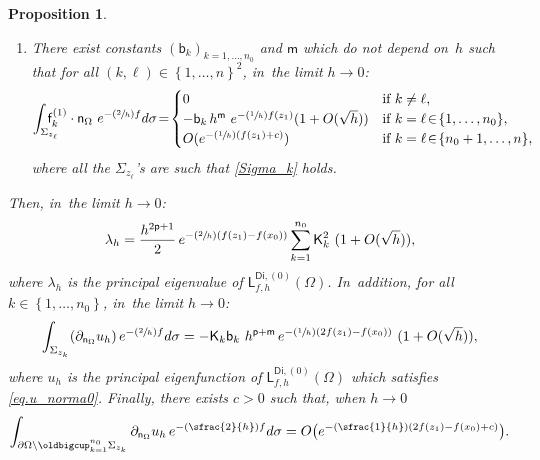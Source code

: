 \documentclass[JEP,XML,SOM,Unicode,NoEqCountersInSection,NoFloatCountersInSection,published]{cedram}
\newcommand{\Psfrac}[2]{(\sfrac{#1}{#2})}
\let\lp\langle
\let\rp\rangle
\let\ve\varepsilon
\theoremstyle{plain}
\newtheorem{proposition}{Proposition}
\theoremstyle{definition}
\begin{document}
\begin{proposition}
\begin{enumerate}
\begin{enumerate}
\begin{equation*}
\big \lp \nabla\mathsf u^{(0)}, \mathsf f_k^{(1)}\big\rp_{L^2_w(\Omega)} = \mathsf K_k\ h^{\mathsf p} e^{-\Psfrac{1}{h}(f(z_1)- f(x_0))} \ (1 + O(\sqrt h)),
\end{equation*}
where we recall $f(z_k)=f(z_1)$ for $k=1,\dots,n_0$. If~$k>n_0$, it~holds for $h$ small enough:
\begin{equation*}
\big \vert \big \lp \nabla\mathsf u^{(0)}, \mathsf f_k^{(1)}\big\rp_{L^2_w(\Omega)} \big \vert \le e^{-\Psfrac{1}{h}(f(z_1)- f(x_0) +\ve)}.
\end{equation*}
\item\label{ESTIME4b}
There exist constants $(\mathsf b_k)_{k=1,\dots,n_0}$ and $\mathsf m$ which do not depend on~$h$ such that for all $ (k,\ell)
\in \left\{1,\ldots,n\right\}^2$, in~the limit $h\to 0$:
\begin{equation*}
\int_{\Sigma_{z_\ell}} \!\!\! \!\!\! \mathsf
f_k^{(1)} \cdot \mathsf n_\Omega \ e^{-\Psfrac{2}{h} f} d\sigma
\!=\! \begin{cases} 0 & \text{if } k\neq \ell,\\
- \mathsf b_k \, h^{\mathsf m } \ e^{-\Psfrac{1}{h} f(z_1)} (1 + O(\sqrt h)) & \text{if } k=\ell \!\in\! \{1,\dots,n_0\}, \\
O(e^{-\Psfrac 1h (f(z_1) +c)}) & \text{if } k=\ell \!\in\! \{n_0+1,\ldots,n\},
\end{cases}
\end{equation*}
where all the $\Sigma_{z_\ell}$'s are such that \eqref{Sigma_k} holds.
\end{enumerate}
\end{enumerate}
Then, in~the limit $h\to 0$:
\[
\lambda_h=\frac{h^{2\mathsf p+1}}{2} \, e^{-\Psfrac{2}{h}(f(z_1)- f(x_0))} \sum_{k=1}^{n_0} \mathsf K_k^2 \ (1 + O(\sqrt h)),
\]
where $\lambda_h$ is the principal eigenvalue of $\mathsf L^{\mathsf{Di},(0)}_{f,h}(\Omega)$. In~addition, for all $k\in \left\{1,\ldots,n_0\right\}$, in~the limit $h\to 0$:
\begin{equation*}
\int_{\Sigma_{z_k}} (\partial_{\mathsf n_\Omega} u_h)\, e^{-\Psfrac{2}{h}f} d\sigma = -\mathsf K_k \mathsf b_k \ h^{\mathsf p+\mathsf m} \, e^{-\Psfrac{1}{h}(2f(z_1)- f(x_0))} \ (1+ O(\sqrt h)),
\end{equation*}
where $u_h$ is the principal eigenfunction of $\mathsf L^{\mathsf{Di},(0)}_{f,h}(\Omega)$ which satisfies \eqref{eq.u_norma0}. Finally, there exists $c>0$ such that, when $h\to 0$
\[
\int_{\partial \Omega \setminus \oldbigcup_{k=1}^{n_0}\Sigma_{z_k}} \partial_{\mathsf n_\Omega} u_h \, e^{-\Psfrac{2}{h} f} d\sigma= O\bigl(e^{-\Psfrac{1}{h}(2f(z_1)-f(x_0)+c)} \bigr).
\]
\end{proposition}
\end{document}

